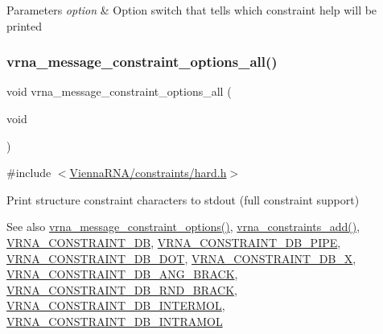 \begin{DoxyParams}{Parameters}
{\em option} & Option switch that tells which constraint help will be printed \\
\hline
\end{DoxyParams}
\mbox{\label{group__constraints_gaec7e13fa0465c2acc7a621d1aecb709f}} 
\subsubsection{\texorpdfstring{vrna\+\_\+message\+\_\+constraint\+\_\+options\+\_\+all()}{vrna\_message\_constraint\_options\_all()}}
{\footnotesize\ttfamily void vrna\+\_\+message\+\_\+constraint\+\_\+options\+\_\+all (\begin{DoxyParamCaption}\item[{void}]{ }\end{DoxyParamCaption})}



{\ttfamily \#include $<$\hyperlink{hard_8h}{Vienna\+R\+N\+A/constraints/hard.\+h}$>$}



Print structure constraint characters to stdout (full constraint support) 

\begin{DoxySeeAlso}{See also}
\hyperlink{group__constraints_gaa1f20b53bf09ac2e6b0dbb13f7d89670}{vrna\+\_\+message\+\_\+constraint\+\_\+options()}, \hyperlink{group__constraints_ga35a401f680969a556858a8dd5f1d07cc}{vrna\+\_\+constraints\+\_\+add()}, \hyperlink{group__hard__constraints_ga4bfc2f15c4f261c62a11af9d2aa80c90}{V\+R\+N\+A\+\_\+\+C\+O\+N\+S\+T\+R\+A\+I\+N\+T\+\_\+\+DB}, \hyperlink{group__hard__constraints_ga13053547a2de5532b64b64d35e097ae1}{V\+R\+N\+A\+\_\+\+C\+O\+N\+S\+T\+R\+A\+I\+N\+T\+\_\+\+D\+B\+\_\+\+P\+I\+PE}, \hyperlink{group__hard__constraints_ga369bea82eae75fbe626f409fa425747e}{V\+R\+N\+A\+\_\+\+C\+O\+N\+S\+T\+R\+A\+I\+N\+T\+\_\+\+D\+B\+\_\+\+D\+OT}, \hyperlink{group__hard__constraints_ga7283bbe0f8954f7b030ecc3f2d1932b2}{V\+R\+N\+A\+\_\+\+C\+O\+N\+S\+T\+R\+A\+I\+N\+T\+\_\+\+D\+B\+\_\+X}, \hyperlink{hard_8h_ad54c1315a47d55653dcaa5de6e544b77}{V\+R\+N\+A\+\_\+\+C\+O\+N\+S\+T\+R\+A\+I\+N\+T\+\_\+\+D\+B\+\_\+\+A\+N\+G\+\_\+\+B\+R\+A\+CK}, \hyperlink{group__hard__constraints_gac17b034852c914bc5879954c65d7e74b}{V\+R\+N\+A\+\_\+\+C\+O\+N\+S\+T\+R\+A\+I\+N\+T\+\_\+\+D\+B\+\_\+\+R\+N\+D\+\_\+\+B\+R\+A\+CK}, \hyperlink{group__hard__constraints_ga31d0ebb9755ca8a4acafc14f00ca755d}{V\+R\+N\+A\+\_\+\+C\+O\+N\+S\+T\+R\+A\+I\+N\+T\+\_\+\+D\+B\+\_\+\+I\+N\+T\+E\+R\+M\+OL}, \hyperlink{group__hard__constraints_ga5c17253f5a39d1d49b0fb11f5196982a}{V\+R\+N\+A\+\_\+\+C\+O\+N\+S\+T\+R\+A\+I\+N\+T\+\_\+\+D\+B\+\_\+\+I\+N\+T\+R\+A\+M\+OL} 
\end{DoxySeeAlso}
